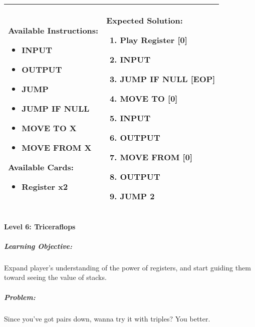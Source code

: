\begin{center}
    \begin{tabular}{ | m{6cm} | m{8cm} | } 
        \hline
            \textbf{Available Instructions:} 
            \begin{itemize}
                \setlength\itemsep{-.35em}
                \item INPUT
                \item OUTPUT
                \item JUMP
                \item JUMP IF NULL
                \item MOVE TO X
                \item MOVE FROM X
            \end{itemize}
            \textbf{Available Cards:} 
            \begin{itemize}
                \setlength\itemsep{-.35em}
                \item Register x2
            \end{itemize}& 
            \textbf{Expected Solution:} 
            \begin{enumerate}
                \setlength\itemsep{-.35em}
                \item Play Register [0]
                \item INPUT
                \item JUMP IF NULL [EOP]
                \item MOVE TO [0]
                \item INPUT
                \item OUTPUT
                \item MOVE FROM [0] 
                \item OUTPUT
                \item JUMP 2
            \end{enumerate}
            \\
        \hline
    \end{tabular}
\end{center}


\paragraph{Level 6: Triceraflops}
\subparagraph{Learning Objective:} Expand player's understanding of the power of registers, and start guiding them toward seeing the value of stacks.

\subparagraph{Problem:} Since you've got pairs down, wanna try it with triples? You better.

